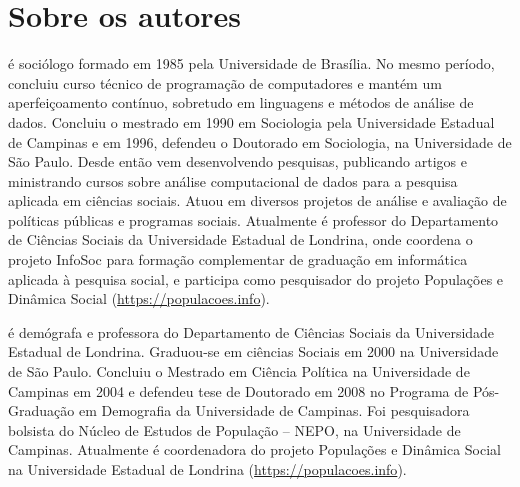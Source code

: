 \documentclass[
  brazilian,
  11pt,
  a4paper,
  open = right,
  twoside = true]{scrbook}
\providecommand{\tightlist}{%
  \setlength{\itemsep}{0pt}\setlength{\parskip}{0pt}}
\begin{document}
\protect{}\label{refs}

\chapter*{Sobre os autores}\label{sobre-os-autores}


\begin{description}
\tightlist
\item[Ronaldo Baltar]
é sociólogo formado em 1985 pela Universidade de Brasília. No mesmo
período, concluiu curso técnico de programação de computadores e mantém
um aperfeiçoamento contínuo, sobretudo em linguagens e métodos de
análise de dados. Concluiu o mestrado em 1990 em Sociologia pela
Universidade Estadual de Campinas e em 1996, defendeu o Doutorado em
Sociologia, na Universidade de São Paulo. Desde então vem desenvolvendo
pesquisas, publicando artigos e ministrando cursos sobre análise
computacional de dados para a pesquisa aplicada em ciências sociais.
Atuou em diversos projetos de análise e avaliação de políticas públicas
e programas sociais. Atualmente é professor do Departamento de Ciências
Sociais da Universidade Estadual de Londrina, onde coordena o projeto
InfoSoc para formação complementar de graduação em informática aplicada
à pesquisa social, e participa como pesquisador do projeto Populações e
Dinâmica Social (\url{https://populacoes.info}).
\item[Cláudia Siqueira Baltar]
é demógrafa e professora do Departamento de Ciências Sociais da
Universidade Estadual de Londrina. Graduou-se em ciências Sociais em
2000 na Universidade de São Paulo. Concluiu o Mestrado em Ciência
Política na Universidade de Campinas em 2004 e defendeu tese de
Doutorado em 2008 no Programa de Pós-Graduação em Demografia da
Universidade de Campinas. Foi pesquisadora bolsista do Núcleo de Estudos
de População -- NEPO, na Universidade de Campinas. Atualmente é
coordenadora do projeto Populações e Dinâmica Social na Universidade
Estadual de Londrina (\url{https://populacoes.info}).
\end{description}


\backmatter
\end{document}
